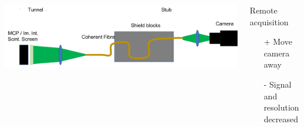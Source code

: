 \begin{frame}[t]
\begin{columns}[T]
\begin{column}{0.45\textwidth}
\begin{center}
      \end{center}
    \end{column}
  \end{columns}
  \begin{columns}[T]
    \begin{column}{0.60\textwidth}
      \vspace{0.25cm}
      \includegraphics[width=1\textwidth]{05_Conclusion/fig/fig000_schematic_coherentr_fiber}
    \end{column}
    \begin{column}{0.35\textwidth}
      \begin{block}{Remote acquisition}
        \begin{itemize}
          \item[+] Move camera away
          \item[-] Signal and resolution decreased
        \end{itemize}
      \end{block}
    \end{column}
  \end{columns}
\end{frame}

